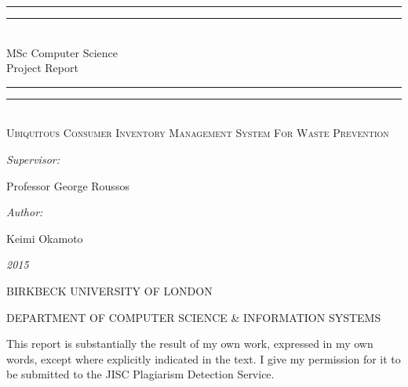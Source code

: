 \documentclass[a4paper, 11pt]{article}
\newlength{\drop}
\begin{document}
  \begin{titlepage}
	\thispagestyle{empty}
    \textheight
    \centering
    \vspace*{\baselineskip}
    \rule{\textwidth}{1.6pt}\vspace*{-\baselineskip}\vspace*{2pt}
    \rule{\textwidth}{0.4pt}\\[\baselineskip]
    {\Large{MSc Computer Science\\[0.3\baselineskip] }} 	
    {\huge{Project Report\\[0.3\baselineskip] }}
	
    \rule{\textwidth}{0.4pt}\vspace*{-\baselineskip}\vspace{3.2pt}
    \rule{\textwidth}{1.6pt}
    \\[\baselineskip]
    \scshape
    {\Large Ubiquitous Consumer Inventory Management System For Waste Prevention\\}
    \vspace*{2\baselineskip}
    {\normalsize\emph{Supervisor: }{\large Professor George Roussos\par}}
    {\normalsize\emph{Author: }{\large Keimi Okamoto\par}}
    
    {\itshape 2015}
    \vfill
    {\large BIRKBECK UNIVERSITY OF LONDON\par}
{\footnotesize DEPARTMENT OF COMPUTER SCIENCE \& INFORMATION SYSTEMS}\par
    \vspace*{\baselineskip}
    \vspace*{\baselineskip}

 {\footnotesize This report is substantially the result of my own work, expressed in my own words, except where
explicitly indicated in the text. I give my permission for it to be submitted to the JISC Plagiarism
Detection Service.}\par
  \end{titlepage}
  
  

\tableofcontents
\clearpage
\end{document}
